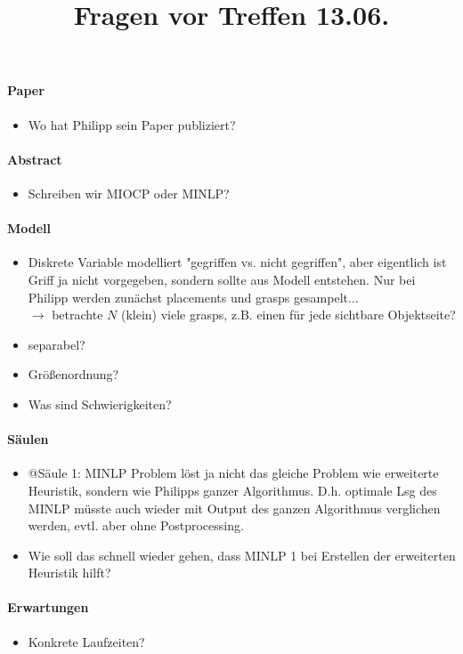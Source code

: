 \documentclass{article}
\title{\textbf{Fragen vor Treffen 13.06.}}
\date{}
\begin{document}
\maketitle
\paragraph{Paper}
\begin{itemize}
\item Wo hat Philipp sein Paper publiziert?
\end{itemize}

\paragraph{Abstract}
\begin{itemize}
\item Schreiben wir MIOCP oder MINLP?
\end{itemize}


\paragraph{Modell}
\begin{itemize}
\item Diskrete Variable modelliert "gegriffen vs. nicht gegriffen", aber eigentlich ist Griff ja nicht vorgegeben, sondern sollte aus Modell entstehen. Nur bei Philipp werden zun\"achst placements und grasps gesampelt...\\
$\rightarrow$ betrachte $N$ (klein) viele grasps, z.B. einen f\"ur jede sichtbare Objektseite?
\item separabel?
\item Gr\"o\ss{}enordnung?
\item Was sind Schwierigkeiten?
\end{itemize}

\paragraph{S\"aulen}
\begin{itemize}
\item @S\"aule 1: MINLP Problem l\"ost ja nicht das gleiche Problem wie erweiterte Heuristik, sondern wie Philipps ganzer Algorithmus. D.h. optimale Lsg des MINLP m\"usste auch wieder mit Output des ganzen Algorithmus verglichen werden, evtl. aber ohne Postprocessing.
\item Wie soll das schnell wieder gehen, dass MINLP 1 bei Erstellen der erweiterten Heuristik hilft?

\end{itemize}

\paragraph{Erwartungen}
\begin{itemize}
\item Konkrete Laufzeiten?
\end{itemize}
\end{document}
